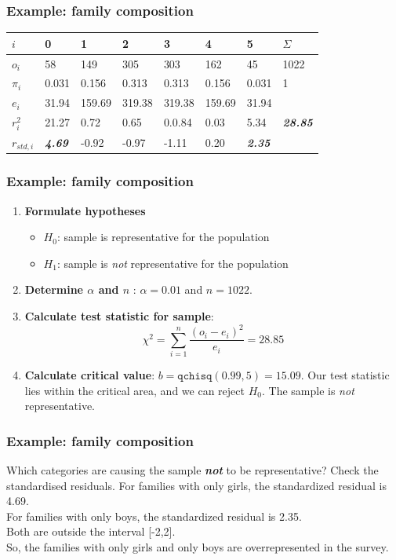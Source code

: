 \documentclass{beamer}
\begin{document}
\begin{frame}
  \frametitle{Example: family composition}
  \begin{table}[h]
\begin{tabular}{@{}llllllll@{}}
\toprule
$i$          & 0        & 1        & 2        & 3        & 4       & 5       & $\Sigma$\\ \midrule
$o_i$        & 58       & 149      & 305      & 303      & 162     & 45      & 1022    \\
$\pi_i$      & 0.031    & 0.156    & 0.313    & 0.313  & 0.156 & 0.031 & 1       \\
$e_i$        & 31.94   & 159.69  & 319.38  & 319.38  & 159.69 & 31.94  &         \\
$r_i^2$      & 21.27 & 0.72  & 0.65   & 0.0.84  & 0.03 & 5.34 & \textbf{\textit{28.85}} \\
$r_{std,i}$  & \textbf{\textit{4.69}}   & -0.92 & -0.97 & -1.11 & 0.20 & \textbf{\textit{2.35}} &         \\ \bottomrule
\end{tabular}
\end{table}
\end{frame}

\begin{frame}
  \frametitle{Example: family composition}
  \begin{enumerate}
  \item \textbf{Formulate hypotheses}
    \begin{itemize}
      \item $H_{0}$: sample is representative for the population
      \item $H_{1}$: sample is \emph{not} representative for the population
    \end{itemize}
  \item \textbf{Determine $\alpha$ and $n$} : $\alpha = 0.01$ and $n = 1022$.
  \item \textbf{Calculate test statistic for sample}:
  \[ \chi^{2} = \sum_{i=1}^{n} \frac{(o_{i} - e_{i})^{2}}{e_{i}} = 28.85 \]
  \item \textbf{Calculate critical value}: $b = \texttt{qchisq}(0.99,5)=15.09$. Our test statistic lies within the critical area, and we can reject $H_{0}$. The sample is \emph{not} representative.
\end{enumerate}
\end{frame}

\begin{frame}
  \frametitle{Example: family composition}
  Which categories are causing the sample \textbf{\textit{not}} to be representative?
\vfill
  Check the standardised residuals.
\vfill
  For families with only girls, the standardized residual is 4.69.\\
  For families with only boys, the standardized residual is 2.35.\\
  Both are outside the interval [-2,2].\\
\vfill
  So, the families with only girls and only boys are overrepresented in the survey.
\end{frame}
\end{document}
